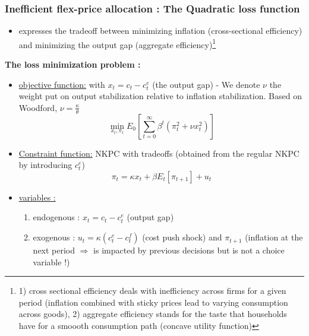\documentclass{article}
\begin{document}
\subsubsection{Inefficient flex-price allocation : The Quadratic loss function}
\begin{itemize}
    \item expresses the tradeoff between minimizing inflation (cross-sectional efficiency) and minimizing the output gap (aggregate efficiency)\footnote{1) cross sectional efficiency deals with inefficiency across firms for a given period (inflation combined with sticky prices lead to varying consumption across goods), 2) aggregate efficiency stands for the taste that households have for a smoooth consumption path (concave utility function)}
\end{itemize}
\textbf{The loss minimization problem :}
\begin{itemize}
    \item \underline{objective function:} with $x_t = c_t-c_t^e$ (the output gap)
        \subitem  - We denote $\nu$ the weight put on output stabilization relative to inflation stabilization. Based on Woodford, $\nu = \frac{\kappa}{\theta}$
    \begin{equation}
    \min_{x_t,\pi_t}E_0[\sum_{t=0}^{\infty}\beta^t(\pi_t^2+\nu x_t^2)]
    \end{equation}
    \item \underline{Constraint function:} NKPC with tradeoffs (obtained from the regular NKPC by introducing $c_t^e$)
    \begin{equation}
        \pi_t = \kappa x_t + \beta E_t[\pi_{t+1}]+u_t 
    \end{equation}
    \item \underline{variables :}
    \begin{enumerate}
        \item endogenous : $x_t=c_t-c_t^e$ (output gap) 
        \item exogenous : $u_t = \kappa (c_t^e-c_t^f)$ (cost push shock) and $\pi_{t+1}$ (inflation at the next period $\Longrightarrow$ is impacted by previous decisions but is not a choice variable !)
    \end{enumerate}
\end{itemize}
\end{document}
